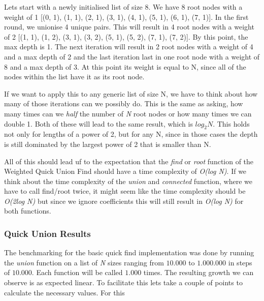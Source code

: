 \documentclass[12pt]{article}
\begin{document}
Lets start with a newly initialised list of size 8. We have 8 root nodes with a weight of 1
[(0, 1), (1, 1), (2, 1), (3, 1), (4, 1), (5, 1), (6, 1), (7, 1)]. In the first round, we unionise
4 unique pairs. This will result in 4 root nodes with a weight of 2
[(1, 1), (1, 2), (3, 1), (3, 2), (5, 1), (5, 2), (7, 1), (7, 2)]. By this point, the max 
depth is 1. The next iteration will result in 2 root nodes with a weight of 4 and a max depth of 2 and the last 
iteration last in one root node with a weight of 8 and a max depth of 3. At this point its weight is equal to N, 
since all of the nodes within the list have it as its root node. 

\pagebreak

If we want to apply this to any generic list of size N, we have to think about how many
of those iterations can we possibly do. This is the same as asking, how many times can we \emph{half}
the number of \emph{N} root nodes or how many times we can double 1. Both of these will
lead to the same result, which is \emph{$log_2 N$}. This holds not only for lengths of a power of 2,
but for any N, since in those cases the depth is still dominated by the largest power of 2 that is 
smaller than N.

All of this should lead uf to the expectation that the \emph{find} or \emph{root} function of
the Weighted Quick Union Find should have a time complexity of \emph{O(log N)}. If we think about
the time complexity of the \emph{union} and \emph{connected} function, where we have to call find/root
twice, it might seem like the time complexity should be \emph{O(2log N)} but since we ignore coefficients
this will still result in \emph{O(log N)} for both functions.

\subsubsection{Quick Union Results}

The benchmarking for the basic quick find implementation was done by running the \emph{union} function
on a list of \emph{N} sizes ranging from $10.000$ to $1.000.000$ in steps of $10.000$. Each function will be called $1.000$ times.
 The resulting growth we can observe is as expected linear. To facilitate this lets take a couple of points to calculate
the necessary values. For this 
\end{document}
